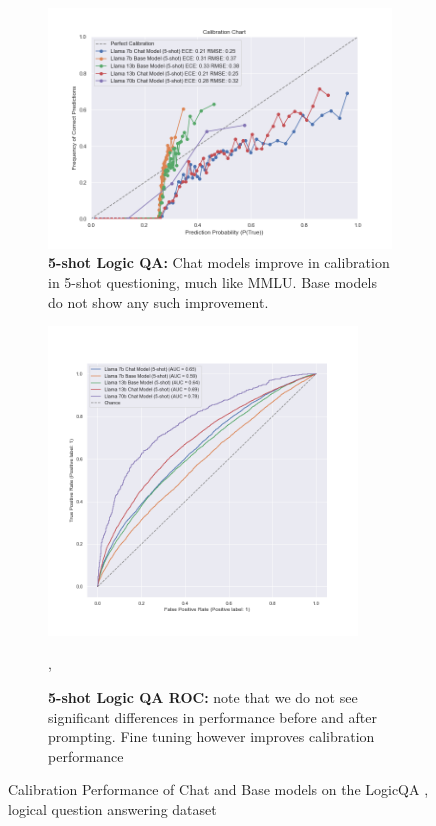 \documentclass[11pt]{article}
\begin{document}
\begin{figure}
     \hfill
     \begin{subfigure}[b]{0.60\textwidth}
         \centering
         \includegraphics[width=1.0\textwidth]{figures/5-shot-logic-qa.png}
         \caption{\textbf{5-shot Logic QA:} Chat models improve in calibration in 5-shot questioning, much like MMLU. Base models do not show any such improvement.}
         \label{fig:5-shot-logic-qa}
     \end{subfigure}     
    \hfill 
     \begin{subfigure}[b]{0.38\textwidth}
         \centering \includegraphics[width=0.9\textwidth]{figures/5-shot-logic-qa-roc.png}
         \caption{\textbf{5-shot Logic QA ROC:}  note that we do not see significant differences in performance before and after prompting. Fine tuning however improves calibration performance},
         \label{fig:5-shot-logic-qa-roc}
    \end{subfigure} 
        \caption{Calibration Performance of Chat and Base models on the LogicQA , logical question answering dataset}
        \label{fig:logic-qa}
\end{figure}
\end{document}
